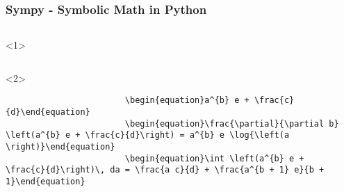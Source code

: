 \documentclass{beamer}
\begin{document}
        \begin{frame}[t,fragile]
            \frametitle{Sympy - Symbolic Math in Python}
            \begin{columns}[onlytextwidth]
                \begin{column}[T]{0.75\textwidth}
                    \begin{onlyenv}<1>
                        \inputminted{python}{\assetPath/Code/sympyexample.py}
                    \end{onlyenv}
                    \begin{onlyenv}<2>
                        \begin{verbatim}
                        \begin{equation}a^{b} e + \frac{c}{d}\end{equation}
                        \begin{equation}\frac{\partial}{\partial b} \left(a^{b} e + \frac{c}{d}\right) = a^{b} e \log{\left(a \right)}\end{equation}
                        \begin{equation}\int \left(a^{b} e + \frac{c}{d}\right)\, da = \frac{a c}{d} + \frac{a^{b + 1} e}{b + 1}\end{equation}
                        \end{verbatim}
                    \end{onlyenv}
                \end{column}\hfill
                \begin{column}[T]{0.2\textwidth}
                    \centering
                    
                \end{column}
            \end{columns}
        \end{frame}
\end{document}
